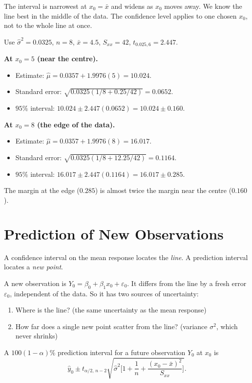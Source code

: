 The interval is narrowest at $x_0=\bar{x}$ and widens as $x_0$ moves away. We know the line best in the middle of the data. The confidence level applies to one chosen $x_0$, not to the whole line at once.

\begin{example}
Use $\hat\sigma^2=0.0325$, $n=8$, $\bar{x}=4.5$, $S_{xx}=42$, $t_{0.025,6}=2.447$.

\textbf{At $x_0=5$ (near the centre).}
\begin{itemize}
  \item Estimate: $\hat\mu=0.0357+1.9976(5)=10.024$.
  \item Standard error: $\sqrt{0.0325(1/8+0.25/42)}=0.0652$.
  \item $95\%$ interval: $10.024\pm2.447(0.0652)=10.024\pm0.160$.
\end{itemize}

\textbf{At $x_0=8$ (the edge of the data).}
\begin{itemize}
  \item Estimate: $\hat\mu=0.0357+1.9976(8)=16.017$.
  \item Standard error: $\sqrt{0.0325(1/8+12.25/42)}=0.1164$.
  \item $95\%$ interval: $16.017\pm2.447(0.1164)=16.017\pm0.285$.
\end{itemize}
The margin at the edge ($0.285$) is almost twice the margin near the centre ($0.160$).
\end{example}

\section{Prediction of New Observations}

A confidence interval on the mean response locates the \emph{line}. A prediction interval locates a \emph{new point}.

A new observation is $Y_0=\beta_0+\beta_1x_0+\varepsilon_0$. It differs from the line by a fresh error $\varepsilon_0$, independent of the data. So it has two sources of uncertainty:
\begin{enumerate}
  \item Where is the line? (the same uncertainty as the mean response)
  \item How far does a single new point scatter from the line? (variance $\sigma^2$, which never shrinks)
\end{enumerate}

\begin{theorem}\label{thm:regpi}
A $100(1-\alpha)\%$ prediction interval for a future observation $Y_0$ at $x_0$ is
\[ \hat{y}_0\pm t_{\alpha/2,\,n-2}\sqrt{\hat\sigma^2\Big[1+\frac1n+\frac{(x_0-\bar{x})^2}{S_{xx}}\Big]}. \]
\end{theorem}

